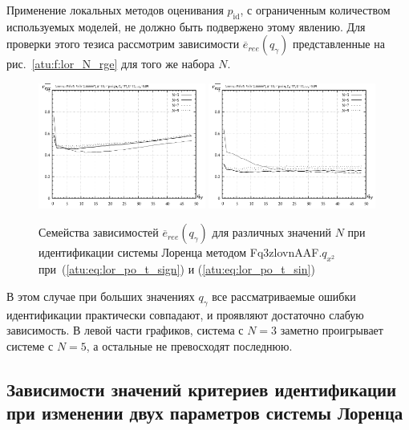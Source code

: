 Применение локальных методов оценивания $p_\mathrm{id}$,
с ограниченным количеством используемых моделей, не должно быть подвержено
этому явлению. Для проверки этого тезиса рассмотрим зависимости
$\overline{e}_{ree}(q_\gamma)$
представленные на рис.~\ref{atu:f:lor_N_rge}
для того же набора $N$.

\begin{figure}[ht!]
  \centerline{
    \includegraphics[width=0.49\textwidth]{p/cha/lor/Fq3zlovnAAF/N/lor_Fq3zlovnAAF_qx2_p_qg_e_ree_sign.png}
    \hfill
    \includegraphics[width=0.49\textwidth]{p/cha/lor/Fq3zlovnAAF/N/lor_Fq3zlovnAAF_qx2_p_qg_e_ree_sin.png}
  }
  \caption{Семейства зависимостей $\overline{e}_{ree}(q_\gamma)$ для различных значений $N$ при идентификации системы Лоренца методом Fq3zlovnAAF.$q_{x^2}$
   при~(\ref{atu:eq:lor_po_t_sign}) и (\ref{atu:eq:lor_po_t_sin})}
  \label{atu:f:lor_N_ree}
\end{figure}

В этом случае при больших значениях $q_\gamma$ все рассматриваемые ошибки идентификации
практически совпадают, и проявляют достаточно слабую зависимость.
В левой части графиков, система с $N=3$ заметно
проигрывает системе с $N=5$, а остальные не превосходят последнюю.







\subsection{Зависимости значений критериев идентификации при изменении двух параметров системы Лоренца}  %

